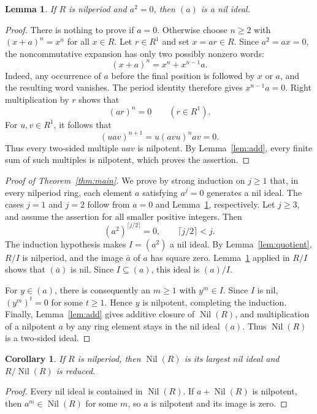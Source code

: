 \documentclass[11pt]{article}
\newtheorem{lemma}[theorem]{Lemma}
\newtheorem{corollary}[theorem]{Corollary}
\theoremstyle{remark}
\DeclareMathOperator{\Nil}{Nil}
\begin{document}
\begin{lemma}\label{lem:square-zero}
If $R$ is nilperiod and $a^2=0$, then $(a)$ is a nil ideal.
\end{lemma}
\begin{proof}
There is nothing to prove if $a=0$. Otherwise choose $n\geq2$ with
$(x+a)^n=x^n$ for all $x\in R$.
Let $r\in R^1$ and set $x=ar\in R$. Since $a^2=ax=0$, the
noncommutative expansion has only two possibly nonzero words:
\[
 (x+a)^n=x^n+x^{n-1}a.
\]
Indeed, any occurrence of $a$ before the final position is followed by
$x$ or $a$, and the resulting word vanishes. The period identity therefore
gives $x^{n-1}a=0$. Right multiplication by $r$ shows that
\begin{equation}\label{eq:multiple}
 (ar)^n=0\qquad(r\in R^1).
\end{equation}
For $u,v\in R^1$, it follows that
\[
 (uav)^{n+1}=u(avu)^n av=0.
\]
Thus every two-sided multiple $uav$ is nilpotent. By
Lemma~\ref{lem:add}, every finite sum of such multiples is nilpotent,
which proves the assertion.
\end{proof}

\begin{proof}[Proof of Theorem~\ref{thm:main}]
We prove by strong induction on $j\geq1$ that, in every nilperiod ring,
each element $a$ satisfying $a^j=0$ generates a nil ideal.
The cases $j=1$ and $j=2$ follow from $a=0$ and
Lemma~\ref{lem:square-zero}, respectively.
Let $j\geq3$, and assume the assertion for all smaller positive integers.
Then
\[
 (a^2)^{\lceil j/2\rceil}=0,\qquad \lceil j/2\rceil<j.
\]
The induction hypothesis makes $I=(a^2)$ a nil ideal. By
Lemma~\ref{lem:quotient}, $R/I$ is nilperiod, and the image $\bar a$ of
$a$ has square zero. Lemma~\ref{lem:square-zero} applied in $R/I$ shows
that $(\bar a)$ is nil. Since $I\subseteq(a)$, this ideal is $(a)/I$.

For $y\in(a)$, there is consequently an $m\geq1$ with $y^m\in I$.
Since $I$ is nil, $(y^m)^t=0$ for some $t\geq1$. Hence $y$ is
nilpotent, completing the induction.
Finally, Lemma~\ref{lem:add} gives additive closure of $\Nil(R)$,
and multiplication of a nilpotent $a$ by any ring element stays in the
nil ideal $(a)$. Thus $\Nil(R)$ is a two-sided ideal.
\end{proof}

\begin{corollary}
If $R$ is nilperiod, then $\Nil(R)$ is its largest nil ideal and
$R/\Nil(R)$ is reduced.
\end{corollary}
\begin{proof}
Every nil ideal is contained in $\Nil(R)$. If $a+\Nil(R)$ is nilpotent,
then $a^m\in\Nil(R)$ for some $m$, so $a$ is nilpotent and its image
is zero.
\end{proof}
\end{document}
